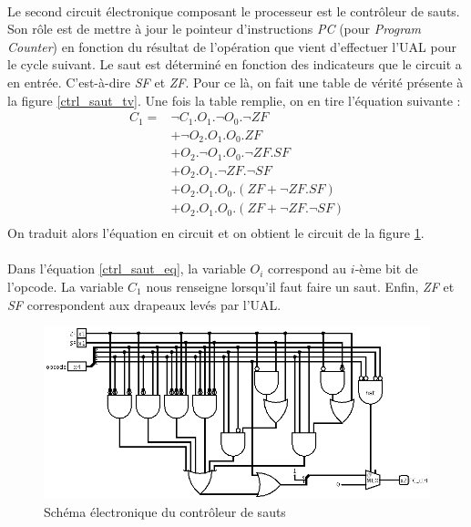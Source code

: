 \paragraph{}{
	Le second circuit électronique composant le processeur est
	le contrôleur de sauts. Son rôle est de mettre à jour le pointeur
	d'instructions \textit{PC} (pour \textit{Program Counter})
	en fonction du résultat de l'opération que vient d'effectuer
	l'UAL pour le cycle suivant. Le saut est déterminé en fonction
	des indicateurs que le circuit a en entrée. C'est-à-dire 
	\textit{SF} et \textit{ZF}. Pour ce là, on fait une table de
	vérité présente à la figure \ref{ctrl_saut_tv}. Une 
	fois la	table remplie, on en tire l'équation suivante :
	\begin{equation}
		\label{ctrl_saut_eq}
		\begin{split}
		C_{1} = & \neg C_{1} . O_{1} . \neg O_{0} . \neg{ZF} \\
				& + \neg O_{2} . O_{1} . O_{0} .  {ZF} \\
				& + O_{2} . \neg O_{1} . O_{0} . \neg{ZF} . {SF} \\
				& + O_{2} . O_{1} . \neg{ZF} . \neg{SF} \\
				& + O_{2} . O_{1} . O_{0} . ( {ZF} + \neg{ZF} . {SF}) \\
				& + O_{2} . O_{1} . O_{0} . ( {ZF} + \neg{ZF} . \neg{SF} ) \\
		\end{split}
	\end{equation}
	On traduit alors l'équation en circuit et on obtient le circuit
	de la figure \ref{control_saut_circ}.
}

\paragraph{}{
	Dans l'équation \ref{ctrl_saut_eq}, la variable $O_{i}$ correspond au $i$-ème
	bit de l'opcode. La variable $C_{1}$ nous renseigne lorsqu'il faut faire un saut.
	Enfin, \textit{ZF} et \textit{SF} correspondent aux drapeaux levés par l'UAL.
}

\begin{figure}[!ht]
	\centering
	\includegraphics[scale=0.4,origin=c]{circuits/control_saut.png}
	\caption{
		\label{control_saut_circ}
		Sch\'{e}ma \'{e}lectronique du contr\^{o}leur de sauts
	}
\end{figure}

